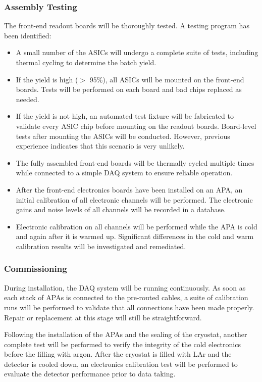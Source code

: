 \subsubsection{Assembly Testing}
\label{subsubsec:ce_install_assembly}

The front-end readout boards will be thoroughly tested. A testing program has been identified:
\begin{itemize}
\item A small number of the ASICs will undergo a complete suite 
of tests, including thermal cycling to determine the batch yield.
\item If the yield is high ($>$ 95\%), all ASICs will be mounted 
on the front-end boards.
Tests will be performed on each board and bad chips replaced as needed.
\item If the yield is not high, an automated test fixture will be 
fabricated to validate every ASIC chip before mounting on the readout boards.
Board-level tests after mounting the ASICs will be conducted.
However, previous experience indicates that this scenario is very unlikely.
\item The fully assembled front-end boards will be thermally cycled multiple times while connected
to a simple DAQ system to ensure reliable operation.
\item After the front-end electronics boards have been installed on an APA,
an initial calibration of all electronic channels will be performed.
The electronic gains and noise levels of all channels will be recorded in a database.
\item Electronic calibration on all channels will be performed while the APA is cold and again after it is warmed up.
Significant differences in the cold and warm calibration results will be investigated and remediated.  
\end{itemize}

%
\subsubsection{Commissioning } 
\label{subsubsec:ce_install_commission}

During installation, the DAQ system will be running continuously.
As soon as each stack of APAs is connected to the pre-routed cables, 
a suite of calibration runs will be performed to validate that all connections have been made properly.
Repair or replacement at this stage will still be straightforward.

Following the installation of the APAs and the sealing of the cryostat,
another complete test will be performed to verify the integrity of the cold electronics before the filling with argon.
After the cryostat is filled with LAr and the detector is cooled down,
an electronics calibration test will be performed to evaluate
the detector performance prior to data taking.

%

